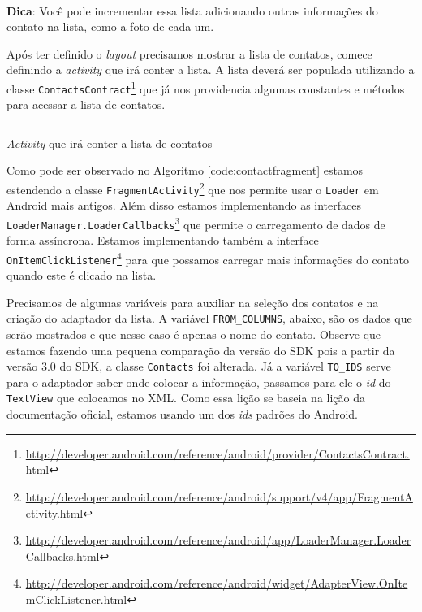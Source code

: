 \documentclass[a4paper,12pt,brazil,oneside]{book}
\begin{document}
\begin{singlespace}
\begin{framed}
\paragraph{}\textbf{Dica}: Você pode incrementar essa lista adicionando outras informações do contato na lista, como a foto de cada um.
\textit{}
\end{framed}

	Após ter definido o \emph{layout} precisamos mostrar a lista de contatos, comece definindo a \emph{activity} que irá conter a lista. A lista deverá ser populada utilizando a classe \texttt{ContactsContract}\footnote{\href{http://developer.android.com/reference/android/provider/ContactsContract.html}{http://developer.android.com/reference/android/provider/ContactsContract.html}} que já nos providencia algumas constantes e métodos para acessar a lista de contatos.

		\begin{listing}[H]
		\inputminted[linenos=true,fontsize=\small,frame=lines, framesep=2mm, tabsize=2,numbersep=5pt]{java}{src/api/contacts/fragment.java}
		\caption{\emph{Activity} que irá conter a lista de contatos}
		\label{code:contactfragment}
		\end{listing} 	
	
	Como pode ser observado no \hyperref[code:contactfragment]{Algoritmo \ref*{code:contactfragment}} estamos estendendo a classe \texttt{FragmentActivity}\footnote{\href{http://developer.android.com/reference/android/support/v4/app/FragmentActivity.html}{http://developer.android.com/reference/android/support/v4/app/FragmentActivity.html}} que nos permite usar o \texttt{Loader} em Android mais antigos. Além disso estamos implementando as interfaces \texttt{LoaderManager.LoaderCallbacks}\footnote{\href{http://developer.android.com/reference/android/app/LoaderManager.LoaderCallbacks.html}{http://developer.android.com/reference/android/app/LoaderManager.LoaderCallbacks.html}} que permite o carregamento de dados de forma assíncrona. Estamos implementando também a interface \texttt{OnItemClickListener}\footnote{\href{http://developer.android.com/reference/android/widget/AdapterView.OnItemClickListener.html}{http://developer.android.com/reference/android/widget/AdapterView.OnItemClickListener.html}} para que possamos carregar mais informações do contato quando este é clicado na lista.
	
	Precisamos de algumas variáveis para auxiliar na seleção dos contatos e na criação do adaptador da lista. A variável \texttt{FROM\_COLUMNS}, abaixo, são os dados que serão mostrados e que nesse caso é apenas o nome do contato. Observe que estamos fazendo uma pequena comparação da versão do SDK pois a partir da versão 3.0 do SDK, a classe \texttt{Contacts} foi alterada. Já a variável \texttt{TO\_IDS} serve para o adaptador saber onde colocar a informação, passamos para ele o \emph{id} do \texttt{TextView} que colocamos no XML. Como essa lição se baseia na lição da documentação oficial, estamos usando um dos \emph{ids} padrões do Android.


\end{singlespace}
\end{document}
